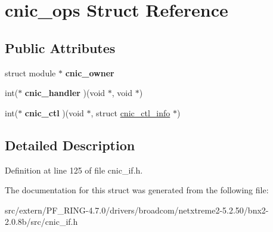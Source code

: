 \hypertarget{structcnic__ops}{
\section{cnic\_\-ops Struct Reference}
\label{structcnic__ops}
}
\subsection*{Public Attributes}
\begin{DoxyCompactItemize}
\item 
\hypertarget{structcnic__ops_a681acd3d6ea5bf27bd11c8394083d78c}{
struct module $\ast$ {\bfseries cnic\_\-owner}}
\label{structcnic__ops_a681acd3d6ea5bf27bd11c8394083d78c}

\item 
\hypertarget{structcnic__ops_a08fbaa94f4925328f278651436ca53c1}{
int($\ast$ {\bfseries cnic\_\-handler} )(void $\ast$, void $\ast$)}
\label{structcnic__ops_a08fbaa94f4925328f278651436ca53c1}

\item 
\hypertarget{structcnic__ops_ae1f162f321808c8117c49ae4ecdd7ab3}{
int($\ast$ {\bfseries cnic\_\-ctl} )(void $\ast$, struct \hyperlink{structcnic__ctl__info}{cnic\_\-ctl\_\-info} $\ast$)}
\label{structcnic__ops_ae1f162f321808c8117c49ae4ecdd7ab3}

\end{DoxyCompactItemize}


\subsection{Detailed Description}


Definition at line 125 of file cnic\_\-if.h.



The documentation for this struct was generated from the following file:\begin{DoxyCompactItemize}
\item 
src/extern/PF\_\-RING-\/4.7.0/drivers/broadcom/netxtreme2-\/5.2.50/bnx2-\/2.0.8b/src/cnic\_\-if.h\end{DoxyCompactItemize}
